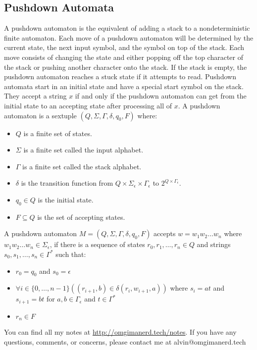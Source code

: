 \documentclass{math}
\begin{document}
\subsection*{Pushdown Automata}
A pushdown automaton is the equivalent of adding a stack to a nondeterministic
finite automaton. Each move of a pushdown automaton will be determined by the
current state, the next input symbol, and the symbol on top of the stack. Each
move consists of changing the state and either popping off the top character of
the stack or pushing another character onto the stack. If the stack is empty,
the pushdown automaton reaches a stuck state if it attempts to read. Pushdown
automata start in an initial state and have a special start symbol on the
stack. They accept a string \( x \) if and only if the pushdown automaton can
get from the initial state to an accepting state after processing all of
\( x \). A pushdown automaton is a sextuple \( (Q,\Sigma,\Gamma,\delta,q_0,F) \)
where:
\begin{itemize}
  \item \( Q \) is a finite set of states.
  \item \( \Sigma \) is a finite set called the input alphabet.
  \item \( \Gamma \) is a finite set called the stack alphabet.
  \item \( \delta \) is the transition function from \( Q\times\Sigma_{\epsilon}
  \times\Gamma_{\epsilon} \) to \( 2^{Q\times\Gamma_{\epsilon}} \).
  \item \( q_0\in Q \) is the initial state.
  \item \( F\subseteq Q \) is the set of accepting states.
\end{itemize}
A pushdown automaton \( M = (Q,\Sigma,\Gamma,\delta,q_0,F) \) accepts
\( w = w_1w_2\dots w_n \) where \( w_1w_2\dots w_n\in\Sigma_{\epsilon} \), if
there is a sequence of states \( r_0,r_1,\dots,r_n\in Q \) and strings
\( s_0,s_1,\dots,s_n\in\Gamma^* \) such that:
\begin{itemize}
  \item \( r_0 = q_0 \) and \( s_0 = \epsilon \)
  \item \( \forall{i}\in\{0,\dots,n-1\}((r_{i+1},b)\in\delta(r_i,w_{i+1},a)) \)
  where \( s_i = at \) and \( s_{i+1} = bt \) for \( a,b\in\Gamma_{\epsilon} \)
  and \( t\in\Gamma^* \)
  \item \( r_n\in F \)
\end{itemize}

\begin{center}
  You can find all my notes at \url{http://omgimanerd.tech/notes}. If you have
  any questions, comments, or concerns, please contact me at
  alvin@omgimanerd.tech
\end{center}
\end{document}
